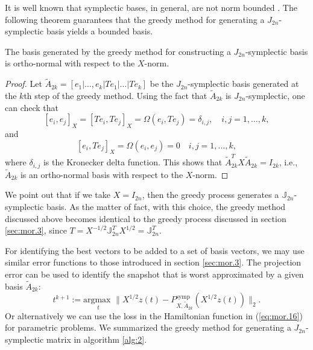 It is well known that symplectic bases, in general, are not norm bounded \cite{doi:10.1137/050628519}. The following theorem guarantees that the greedy method for generating a $J_{2n}$-symplectic basis yields a bounded basis.
\begin{theorem}
The basis generated by the greedy method for constructing a $J_{2n}$-symplectic basis is ortho-normal with respect to the $X$-norm.
\end{theorem}
\begin{proof}
Let $\tilde A_{2k}=[e_1|\dots,e_k|Te_1|\dots|Te_k]$ be the $J_{2n}$-symplectic basis generated at the $k$th step of the greedy method. Using the fact that $\tilde A_{2k}$ is $J_{2n}$-symplectic, one can check that
\begin{equation} \label{eq:normmor.12}
	[e_i,e_j]_X = [Te_i,Te_j]_X = \Omega(e_i,Te_j)=\delta_{i,j}, \quad i,j=1,\dots,k,	
\end{equation}
and
\begin{equation} \label{eq:normmor.13}
	[e_i,Te_j]_X = \Omega(e_i,e_j) = 0\quad i,j=1,\dots,k,
\end{equation}
where $\delta_{i,j}$ is the Kronecker delta function. This shows that $\tilde A_{2k}^TX\tilde A_{2k} = I_{2k}$, i.e., $\tilde A_{2k}$ is an ortho-normal basis with respect to the $X$-norm.
\end{proof}
We point out that if we take $X=I_{2n}$, then the greedy process generates a $\mathbb J_{2n}$- symplectic basis. As the matter of fact, with this choice, the greedy method discussed above becomes identical to the greedy process discussed in section \ref{sec:mor.3}, since $T = X^{-1/2}\mathbb J_{2n}^TX^{1/2} = \mathbb J_{2n}^T$.

For identifying the best vectors to be added to a set of basis vectors, we may use similar error functions to those introduced in section \ref{sec:mor.3}. The projection error can be used to identify the snapshot that is worst approximated by a given basis $\tilde A_{2k}$:
\begin{equation} \label{eq:normmor.14}
	t^{k+1} := \underset{t}{\text{argmax } }\| X^{1/2}z(t) - P^\text{symp}_{X,\tilde A_{2k}}(X^{1/2}z(t)) \|_2. 
\end{equation}
Or alternatively we can use the loss in the Hamiltonian function in (\ref{eq:mor.16}) for parametric problems. We summarized the greedy method for generating a $J_{2n}$-symplectic matrix in algorithm \ref{alg:2}.

